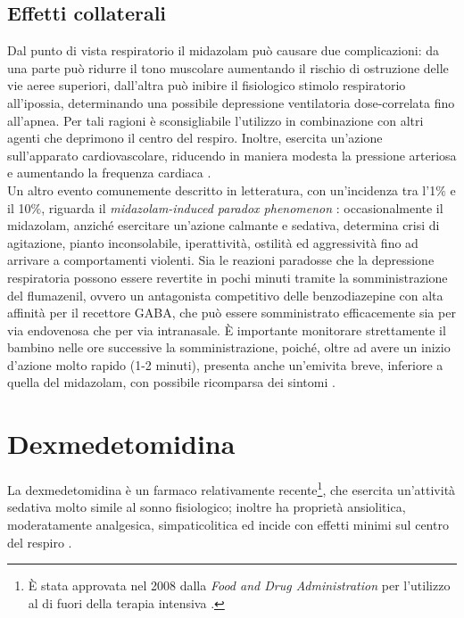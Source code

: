 \subsection*{Effetti collaterali}

Dal punto di vista respiratorio il midazolam può causare due complicazioni: da una parte può ridurre il tono muscolare aumentando il rischio di ostruzione delle vie aeree superiori, dall'altra può inibire il fisiologico stimolo respiratorio all'ipossia, determinando una possibile depressione ventilatoria dose-correlata fino all'apnea. Per tali ragioni è sconsigliabile l'utilizzo in combinazione con altri agenti che deprimono il centro del respiro. 
Inoltre, esercita un'azione sull'apparato cardiovascolare, riducendo in maniera modesta la pressione arteriosa e aumentando la frequenza cardiaca \cite{Olkkola2008}. 
\\Un altro evento comunemente descritto in letteratura, con un'incidenza tra l'1$\%$ e il 10$\%$, riguarda il \emph{midazolam-induced paradox phenomenon} \cite{Weinbroum2001}: occasionalmente il midazolam, anziché esercitare un'azione calmante e sedativa, determina crisi di agitazione, pianto inconsolabile, iperattività, ostilità ed aggressività fino ad arrivare a comportamenti violenti. Sia le reazioni paradosse che la depressione respiratoria possono essere revertite in pochi minuti tramite la somministrazione del flumazenil, ovvero un antagonista competitivo delle benzodiazepine con alta affinità per il recettore GABA, che può essere somministrato efficacemente sia per via endovenosa che per via intranasale. \`E importante monitorare strettamente il bambino nelle ore successive la somministrazione, poiché, oltre ad avere un inizio d'azione molto rapido (1-2 minuti), presenta anche un'emivita breve, inferiore a quella del midazolam, con possibile ricomparsa dei sintomi \cite{Simeupsedazione, Uptodatepharmacology}.



\section{Dexmedetomidina}

La dexmedetomidina è un farmaco relativamente recente\footnote{\`E stata approvata nel 2008 dalla \emph{Food and Drug Administration} per l'utilizzo al di fuori della terapia intensiva \cite{Simeupsedazione, Uptodatepharmacology}.}, che esercita un'attività sedativa molto simile al sonno fisiologico; inoltre ha proprietà ansiolitica, moderatamente analgesica, simpaticolitica ed incide con effetti minimi sul centro del respiro \cite{Mahmoud2015}.

